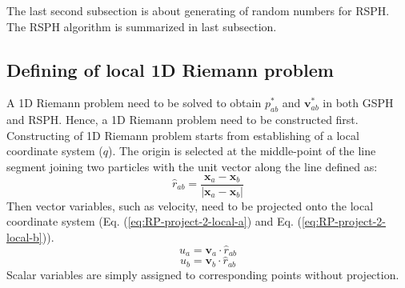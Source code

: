 The last second subsection is about generating of random numbers for RSPH. The RSPH algorithm is summarized in last subsection.

\subsection{Defining of local 1D Riemann problem} \label{sec:RP-construction}
A 1D Riemann problem need to be solved to obtain  $p_{a b}^{\ast}$ and $\textbf{v}_{a b}^{\ast}$ in both GSPH and RSPH. Hence, a 1D Riemann problem need to be constructed first. Constructing of 1D Riemann problem starts from establishing of a local coordinate system ($q$). The origin is selected at the middle-point of the line segment joining two particles with the unit vector along the line defined as: 
\begin{equation}
\hat{r}_{a b}= \frac{\textbf{x}_{a} - \textbf{x}_{ b}}{|\textbf{x}_{a} - \textbf{x}_{ b}|}
\end{equation}
Then vector variables, such as velocity, need to be projected onto the local coordinate system (Eq. (\ref{eq:RP-project-2-local-a}) and Eq. (\ref{eq:RP-project-2-local-b})). 
\begin{equation}
u_{a}= \textbf{v}_{a} \cdot \hat{r}_{a b}
\label{eq:RP-project-2-local-a}
\end{equation}
\begin{equation}
u_{b}= \textbf{v}_{b} \cdot \hat{r}_{a b}
\label{eq:RP-project-2-local-b}
\end{equation}
Scalar variables are simply assigned to corresponding points without projection.

